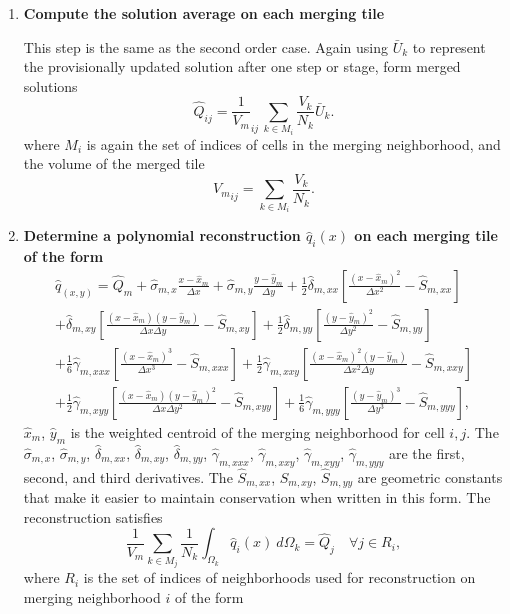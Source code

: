 \begin{enumerate}
\item 
\textbf{Compute the solution average on each merging tile}

This step is the same as the second order case.
Again using $\bar{U}_k$ to represent the provisionally updated 
solution after one step or stage, form merged solutions 
\begin{equation}\label{eq:q_avg1}
     \widehat{Q}_{ij} =  \frac{1}{ V_m}_{ij} \, \sum_{k \in
     M_i}\frac{V_k}{N_k} \bar U_k.
\end{equation}
\noindent where $M_i$ is again the set of indices of cells in the 
merging neighborhood, and the volume of the merged tile 
\begin{equation}\label{eq:modV}
{V_m}_{ij} = \sum_{k \in M_i}\frac{V_k}{N_k} .
\end{equation}

\item \textbf{Determine a polynomial reconstruction $\hat q_i(x)$ on 
each merging tile of the form}
\begin{equation}\label{eq:q}
\begin{aligned}
    \hat q_(x,y) = \hat Q_{m} + \hat \sigma_{m,x}\frac{x-\hat x_m}{\Delta x} +  \hat \sigma_{m,y}\frac{y-\hat y_m}{\Delta y} + \frac{1}{2}\hat \delta_{m, xx}\left[ \frac{(x - \hat x_m)^2 }{\Delta x^2} - \hat S_{m,xx}\right]\\
	    +\hat \delta_{m, xy}\left[ \frac{(x - \hat x_m) (y - \hat y_m) }{\Delta x \Delta y} - \hat S_{m,xy}\right] + \frac{1}{2}\hat \delta_{m, yy}\left[ \frac{(y - \hat y_m)^2 }{\Delta y^2} -  \hat S_{m,yy}\right]\\
	    + \frac{1}{6}\hat\gamma_{m, xxx}\left[ \frac{(x -  \hat x_m)^3 }{\Delta x^3} -  \hat S_{m,xxx}\right] + \frac{1}{2}\hat \gamma_{m, xxy}\left[ \frac{(x - \hat x_m)^2 (y -  \hat y_m) }{\Delta x^2 \Delta y} -  \hat S_{m,xxy}\right]\\
	     + \frac{1}{2}\hat \gamma_{m, xyy}\left[ \frac{(x -  \hat x_m) (y -  \hat y_m)^2 }{\Delta x \Delta y ^2} -  \hat S_{m,xyy}\right]+ \frac{1}{6}\hat \gamma_{m, yyy}\left[ \frac{(y -  \hat y_m)^3 }{\Delta y^3} -  \hat S_{m,yyy}\right],
\end{aligned}
\end{equation}
$\hat x_m$, $\hat y_m$ is the weighted centroid of the merging
neighborhood for cell $i,j$. 
The $\hat \sigma_{m,x}$, $\hat \sigma_{m,y}$, $\hat \delta_{m,xx}$, 
$\hat \delta_{m,xy}$, $\hat \delta_{m,yy}$, $ \hat \gamma_{m,xxx}$, 
$\hat  \gamma_{m,xxy}$, $\hat  \gamma_{m,xyy}$, $\hat  \gamma_{m,yyy}$ 
are the first, second, and third derivatives. 
The $ \hat S_{m,xx}$, $\hat S_{m,xy}$,  $\hat S_{m,yy}$ are geometric
constants that make it easier to maintain conservation when written in
this form.  The reconstruction satisfies
\begin{equation}\label{eq:qi}
\frac{1}{V_m}\sum_{k \in M_j}\frac{1}{N_k}\int_{\Omega_k} \hat q_i(x)~d\Omega_k = \hat Q_j \quad \forall j \in R_i,
\end{equation}
where $R_i$ is the set of indices of neighborhoods used for reconstruction 
on merging neighborhood $i$ of the form



\end{enumerate}
